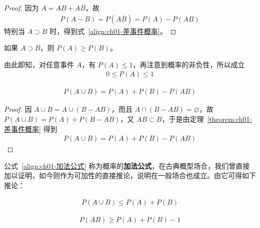 \documentclass[../../main.tex]{subfiles}
\begin{document}
\begin{proof}
因为 $A=AB+A\overline{B}$，故
\begin{align*}
P(A-B)=P(A\overline{B})=P(A)-P(AB)
\end{align*}
特别当 $A\supset B$ 时，得到式~\eqref{align:ch01-差事件概率}。
\end{proof}

\begin{corollary}[单调性]\label{corollary:ch01-单调性}
如果 $A\supset B$，则 $P(A)\geqslant P(B)$。
\end{corollary}

由此即知，对任意事件 $A$，有 $P(A)\leqslant 1$，再注意到概率的非负性，所以成立
\begin{align}
0\leqslant P(A)\leqslant 1\label{align:ch01-概率界}
\end{align}

\begin{theorem}[加法公式]\label{theorem:ch01-加法公式}
\begin{align}
P(A\cup B)=P(A)+P(B)-P(AB)\label{align:ch01-加法公式}
\end{align}
\end{theorem}

\begin{proof}
因 $A\cup B=A\cup(B-AB)$，而且 $A\cap(B-AB)=\varnothing$，故 $P(A\cup B)=P(A)+P(B-AB)$，又 $AB\subset B$，于是由定理~\ref{theorem:ch01-差事件概率} 得到
\begin{align*}
P(A\cup B)=P(A)+P(B)-P(AB)
\end{align*}
\end{proof}

公式~\eqref{align:ch01-加法公式} 称为概率的\textbf{加法公式}，在古典概型场合，我们曾直接加以证明，如今则作为可加性的直接推论，说明在一般场合也成立。由它可得如下推论：

\begin{corollary}\label{corollary:ch01-boole}
\begin{align}
P(A\cup B)\leqslant P(A)+P(B)\label{align:ch01-boole}
\end{align}
\end{corollary}

\begin{corollary}\label{corollary:ch01-bonferroni}
\begin{align}
P(AB)\geqslant P(A)+P(B)-1\label{align:ch01-bonferroni}
\end{align}
\end{corollary}
\end{document}
